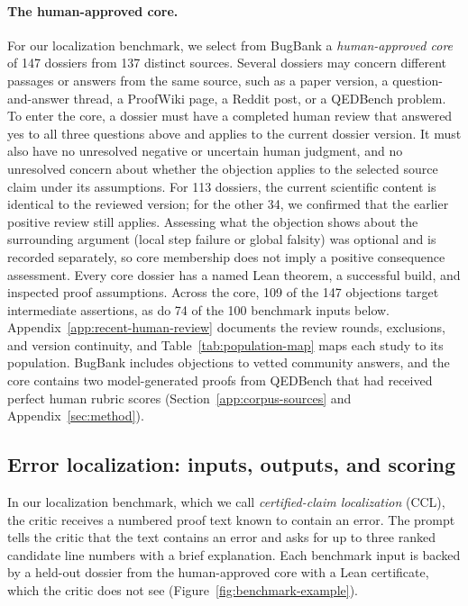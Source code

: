 \paragraph{The human-approved core.}
For our localization benchmark, we select from BugBank a \emph{human-approved core} of 147 dossiers from 137 distinct sources. Several dossiers may concern different passages or answers from the same source, such as a paper version, a question-and-answer thread, a ProofWiki page, a Reddit post, or a QEDBench problem. To enter the core, a dossier must have a completed human review that answered yes to all three questions above and applies to the current dossier version. It must also have no unresolved negative or uncertain human judgment, and no unresolved concern about whether the objection applies to the selected source claim under its assumptions. For 113 dossiers, the current scientific content is identical to the reviewed version; for the other 34, we confirmed that the earlier positive review still applies. Assessing what the objection shows about the surrounding argument (local step failure or global falsity) was optional and is recorded separately, so core membership does not imply a positive consequence assessment. Every core dossier has a named Lean theorem, a successful build, and inspected proof assumptions. Across the core, 109 of the 147 objections target intermediate assertions, as do 74 of the 100 benchmark inputs below. Appendix~\ref{app:recent-human-review} documents the review rounds, exclusions, and version continuity, and Table~\ref{tab:population-map} maps each study to its population. BugBank includes objections to vetted community answers, and the core contains two model-generated proofs from QEDBench \citep{gonzalez2026qedbench} that had received perfect human rubric scores (Section~\ref{app:corpus-sources} and Appendix~\ref{sec:method}).

\subsection{Error localization: inputs, outputs, and scoring}
In our localization benchmark, which we call \emph{certified-claim localization} (CCL), the critic receives a numbered proof text known to contain an error. The prompt tells the critic that the text contains an error and asks for up to three ranked candidate line numbers with a brief explanation. Each benchmark input is backed by a held-out dossier from the human-approved core with a Lean certificate, which the critic does not see (Figure~\ref{fig:benchmark-example}).

